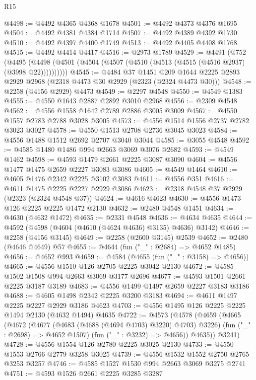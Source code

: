 \begin{lexlean}{R15}
\begin{coremodule}
@4498 := @4492 @4365 @4368 @1678
@4501 := @4492 @4373 @4376 @1695
@4504 := @4492 @4381 @4384 @1714
@4507 := @4492 @4389 @4392 @1730
@4510 := @4492 @4397 @4400 @1749
@4513 := @4492 @4405 @4408 @1768
@4515 := @4492 @4414 @4417
@4516 := @2973 @1789
@4529 := @4491
    (@752 (@4495 (@4498 (@4501 (@4504 (@4507 (@4510 (@4513 (@4515 (@4516 @2937) (@3998 @22))))))))))
@4545 := @4484
    @37
    @1451
    @209
    @1644
    @2225
    @2893
    @2929
    @2968
    (@2318 @4473 @30 @2929 (@2323 (@2324 @4473 @30)))
@4548 := @2258 (@4156 @2929) @4473
@4549 := @2297 @4548
@4550 := @4549 @1383
@4555 := @4550 @1643 @2887 @2892 @3010 @2968
@4556 := @2309 @4548
@4562 := @4556 @1558 @1642 @2789 @2886 @3005 @3009
@4567 := @4550 @1557 @2783 @2788 @3028 @3005
@4573 := @4556 @1514 @1556 @2737 @2782 @3023 @3027
@4578 := @4550 @1513 @2708 @2736 @3045 @3023
@4584 := @4556 @1488 @1512 @2692 @2707 @3040 @3044
@4585 := @3055 @4548
@4592 := @4585 @1480 @1486 @994 @2663 @3069 @3076 @2682
@4593 := @4549 @1462
@4598 := @4593 @1479 @2661 @2225 @3087 @3090
@4604 := @4556 @1477 @1475 @2659 @2227 @3083 @3086
@4605 := @4549 @1464
@4610 := @4605 @1476 @2342 @2225 @3102 @3083
@4611 := @4556 @351
@4616 := @4611 @1475 @2225 @2227 @2929 @3086
@4623 := @2318 @4548 @37 @2929 (@2323 (@2324 @4548 @37))
@4624 := @4616 @4623
@4630 := @4556 @1473 @126 @2225 @2225 @1472 @2130
@4632 := @2480 @4548 @1451
@4634 := @4630 (@4632 @1472)
@4635 := @2331 @4548
@4636 := @4634 @4635
@4644 := @4592 (@4598 (@4604 (@4610 (@4624 @4636) @3135) @4636) @3142)
@4646 := @2258 (@4156 @3145)
@4649 := @2258 (@2600 @3145) @2539
@4652 := @2480 (@4646 @4649) @57
@4655 := @4644 (fun ("_" : @2684) => @4652 @1485)
@4656 := @4652 @993
@4659 := @4584 (@4655 (fun ("_" : @3158) => @4656))
@4665 := @4556 @1510 @126 @2705 @2225 @3042 @2130
@4672 := @4585 @1502 @1508 @994 @2663 @3069 @3177 @2696
@4677 := @4593 @1501 @2661 @2225 @3187 @3189
@4683 := @4556 @1499 @1497 @2659 @2227 @3183 @3186
@4688 := @4605 @1498 @2342 @2225 @3200 @3183
@4694 := @4611 @1497 @2225 @2227 @2929 @3186 @4623
@4703 := @4556 @1495 @126 @2225 @2225 @1494 @2130 (@4632 @1494) @4635
@4722 := @4573
    (@4578
      (@4659
        (@4665
          (@4672
            (@4677 (@4683 (@4688 (@4694 @4703) @3220) @4703) @3226)
            (fun ("_" : @2698) => @4652 @1507)
            (fun ("_" : @3232) => @4656))
          @4635))
      @3241)
@4728 := @4556 @1554 @126 @2780 @2225 @3025 @2130
@4733 := @4550 @1553 @2766 @2779 @3258 @3025
@4739 := @4556 @1532 @1552 @2750 @2765 @3253 @3257
@4746 := @4585 @1527 @1530 @994 @2663 @3069 @3275 @2741
@4751 := @4593 @1526 @2661 @2225 @3285 @3287

\end{coremodule}
\end{lexlean}
